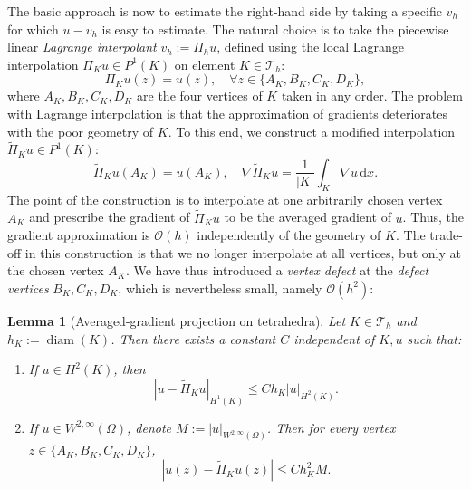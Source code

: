 \documentclass{article}
\newtheorem{lemma}{Lemma}
\begin{document}
The basic approach is now to estimate the right-hand side by taking a specific $v_h$ for which $u-v_h$ is easy to estimate. The natural choice is to take the piecewise linear \emph{Lagrange interpolant} $v_h:=\Pi_h u$, defined using the local Lagrange interpolation $\Pi_K u\in P^1(K)$ on element $K\in\mathcal{T}_h$:
\begin{equation}
\Pi_K u(z)=u(z),\quad\forall z\in\{A_K,B_K,C_K,D_K\},
\end{equation}
where $A_K,B_K,C_K,D_K$ are the four vertices of $K$ taken in any order. The problem with Lagrange interpolation is that the approximation of gradients deteriorates with the poor geometry of $K$. To this end, we construct a modified interpolation $\widetilde{\Pi}_K u\in P^1(K)$:
\begin{equation}
\widetilde{\Pi}_K u(A_K)=u(A_K),\quad \nabla\widetilde{\Pi}_K u=\frac{1}{|K|}\int_K\nabla u\,\mathrm{d}x.
\end{equation}
The point of the construction is to interpolate at one arbitrarily chosen vertex $A_K$ and prescribe the gradient of $\widetilde{\Pi}_K u$ to be the averaged gradient of $u$. Thus, the gradient approximation is $\mathcal{O}(h)$ independently of the geometry of $K$. The trade-off in this construction is that we no longer interpolate at all vertices, but only at the chosen vertex $A_K$. We have thus introduced a \emph{vertex defect} at the \emph{defect vertices} $B_K,C_K,D_K$, which is nevertheless small, namely $\mathcal{O}(h^2)$:


\begin{lemma}[Averaged-gradient projection on tetrahedra]
Let $K\in\mathcal{T}_h$ and $h_K:=\operatorname{diam}(K)$.
Then there exists a constant $C$ independent of $K,u$ such that:
\begin{enumerate}
\item If \(u\in H^2(K)\), then
\[
|u-\widetilde{\Pi}_K u|_{H^1(K)}
\le C h_K |u|_{H^2(K)} .
\]

\item If \(u\in W^{2,\infty}(\Omega)\), denote $M := |u|_{W^{2,\infty}(\Omega)}$. Then for every vertex
\(z\in\{A_K,B_K,C_K,D_K\}\),
\begin{equation}
\label{eq:defect_est}
|u(z)-\widetilde{\Pi}_K u(z)|
\le C h_K^2 M.
\end{equation}
\end{enumerate}
\end{lemma}
\end{document}

